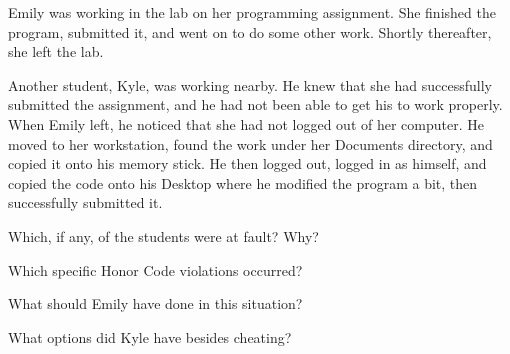 
Emily was working in the lab on her programming assignment.
She finished the program, submitted it, and went on to do some other work.
Shortly thereafter, she left the lab.

\vspace{1em}

Another student, Kyle, was working nearby.
He knew that she had successfully submitted the assignment, and he had not been able to get his to work properly.
When Emily left, he noticed that she had not logged out of her computer.
He moved to her workstation, found the work under her Documents directory, and copied it onto his memory stick.
He then logged out, logged in as himself, and copied the code onto his Desktop where he modified the program a bit, then successfully submitted it.




\Q Which, if any, of the students were at fault? Why?

\begin{answer}[5em]
\end{answer}


\Q Which specific Honor Code violations occurred?

\begin{answer}[5em]
\end{answer}


\Q What should Emily have done in this situation?

\begin{answer}[5em]
\end{answer}


\Q What options did Kyle have besides cheating?

\begin{answer}[5em]
\end{answer}
